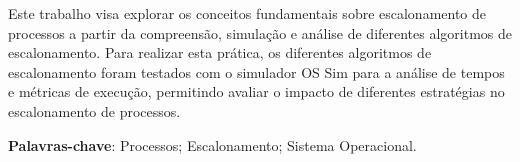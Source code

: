 \documentclass[
	12pt,				%
	oneside,   	        %
	a4paper,			%
	english,			%
	french,				%
	spanish,			%
	brazil,				%
	]{pacotes/abntex2}
\begin{document}
\frenchspacing 



\imprimirfolhaderosto



\begin{resumo}
Este trabalho visa explorar os conceitos fundamentais sobre escalonamento de processos a partir da compreensão, simulação e análise de diferentes algoritmos de escalonamento. Para realizar esta prática, os diferentes algoritmos de escalonamento foram testados com o simulador OS Sim para a análise de tempos e métricas de execução, permitindo avaliar o impacto de diferentes estratégias no escalonamento de processos. 
 \vspace{\onelineskip}
    
 \noindent
 \textbf{Palavras-chave}: Processos; Escalonamento; Sistema Operacional.
\end{resumo}




\tableofcontents*
\cleardoublepage

\textual

\makeatletter
\renewcommand{\chapter}{\@gobbletwo}
\makeatother
\end{document}

